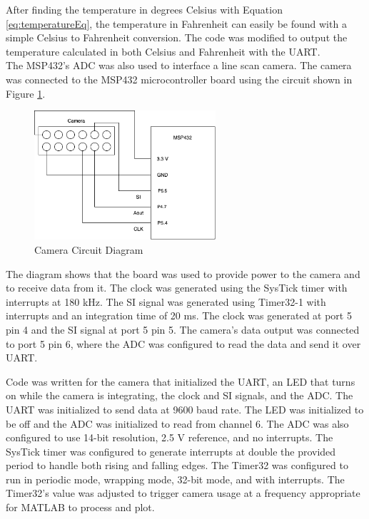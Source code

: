 \documentclass[CMPE]{KGCOEReport}
\begin{document}
After finding the temperature in degrees Celsius with Equation \ref{eq:temperatureEq}, the temperature in Fahrenheit can easily be found with a simple Celsius to Fahrenheit conversion. The code was modified to output the temperature calculated in both Celsius and Fahrenheit with the UART.\\

The MSP432's ADC was also used to interface a line scan camera. The camera was connected to the MSP432 microcontroller board using the circuit shown in Figure \ref{fig:cameraDiagram}.

\begin{figure}[H]
    \centering
    \includegraphics[width=0.6\textwidth]{cameraDiagram.png}
    \caption{Camera Circuit Diagram}
    \label{fig:cameraDiagram}
\end{figure}

The diagram shows that the board was used to provide power to the camera and to receive data from it. The clock was generated using the SysTick timer with interrupts at 180 kHz. The SI signal was generated using Timer32-1 with interrupts and an integration time of 20 ms. The clock was generated at port 5 pin 4 and the SI signal at port 5 pin 5. The camera's data output was connected to port 5 pin 6, where the ADC was configured to read the data and send it over UART.

Code was written for the camera that initialized the UART, an LED that turns on while the camera is integrating, the clock and SI signals, and the ADC. The UART was initialized to send data at 9600 baud rate. The LED was initialized to be off and the ADC was initialized to read from channel 6. The ADC was also configured to use 14-bit resolution, 2.5 V reference, and no interrupts. The SysTick timer was configured to generate interrupts at double the provided period to handle both rising and falling edges. The Timer32 was configured to run in periodic mode, wrapping mode, 32-bit mode, and with interrupts. The Timer32's value was adjusted to trigger camera usage at a frequency appropriate for MATLAB to process and plot.
\end{document}
